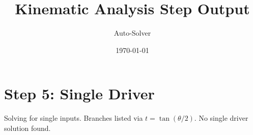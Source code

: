 \documentclass[12pt, a4paper]{article}
\title{\textbf{Kinematic Analysis Step Output}}
\author{Auto-Solver}
\date{\today}
\begin{document}
\maketitle
\section*{Step 5: Single Driver}
Solving for single inputs. Branches listed via $t=\tan(\theta/2)$.
No single driver solution found.
\end{document}
